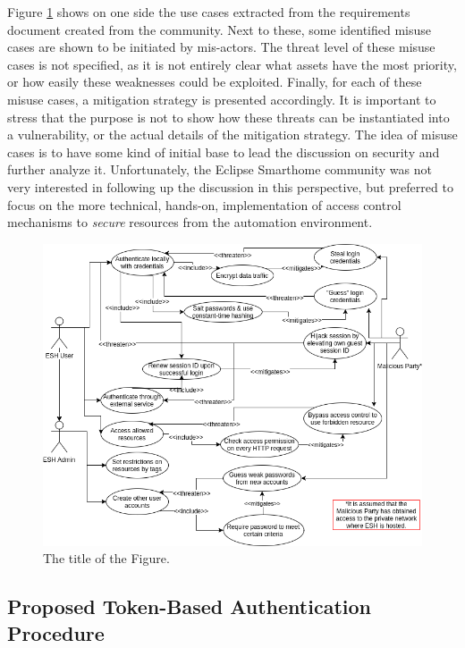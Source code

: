 \documentclass[12pt]{article}
\begin{document}
Figure \ref{fig:misuse_cases} shows on one side the use cases extracted from the requirements document created from the community. Next to these, some identified misuse cases are shown to be initiated by mis-actors. The threat level of these misuse cases is not specified, as it is not entirely clear what assets have the most priority, or how easily these weaknesses could be exploited. Finally, for each of these misuse cases, a mitigation strategy is presented accordingly. It is important to stress that the purpose is not to show how these threats can be instantiated into a vulnerability, or the actual details of the mitigation strategy. The idea of misuse cases is to have some kind of initial base to lead the discussion on security and further analyze it. Unfortunately, the Eclipse Smarthome community was not very interested in following up the discussion in this perspective, but preferred to focus on the more technical, hands-on, implementation of access control mechanisms to \emph{secure} resources from the automation environment.

\begin{figure} [ht] 
\begin{center}
\includegraphics[width=\textwidth]{esh_misuse_cases}
\caption{The title of the Figure.}
\label{fig:misuse_cases}
\end{center}
\end{figure}

\subsection{Proposed Token-Based Authentication Procedure}
\end{document}
